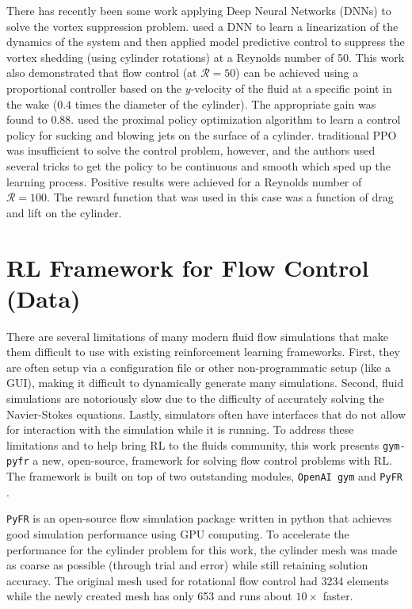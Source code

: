 \documentclass{article}
\begin{document}
There has recently been some work applying Deep Neural Networks (DNNs) to solve the vortex suppression problem. \cite{morton2018deep} used a DNN to learn a linearization of the dynamics of the system and then applied model predictive control to suppress the vortex shedding (using cylinder rotations) at a Reynolds number of 50. This work also demonstrated that flow control (at $\mathcal{R} = 50$) can be achieved using a proportional controller based on the $y$-velocity of the fluid at a specific point in the wake ($0.4$ times the diameter of the cylinder). The appropriate gain was found to $0.88$.  \cite{rabault2018deep, rabault2019artificial} used the proximal policy optimization algorithm to learn a control policy for sucking and blowing jets on the surface of a cylinder. traditional PPO was insufficient to solve the control problem, however, and the authors used several tricks to get the policy to be continuous and smooth which sped up the learning process. Positive results were achieved for a Reynolds number of $\mathcal{R} = 100$. The reward function that was used in this case was a function of drag and lift on the cylinder.

\section{RL Framework for Flow Control (Data)}
\label{sec:data}

There are several limitations of many modern fluid flow simulations that make them difficult to use with existing reinforcement learning frameworks. First, they are often setup via a configuration file or other non-programmatic setup (like a GUI), making it difficult to dynamically generate many simulations. Second, fluid simulations are notoriously slow due to the difficulty of accurately solving the Navier-Stokes equations. Lastly, simulators often have interfaces that do not allow for interaction with the simulation while it is running.  To address these limitations and to help bring RL to the fluids community, this work presents \verb|gym-pyfr| a new, open-source, framework for solving flow control problems with RL. The framework is built on top of two outstanding modules, \verb|OpenAI gym| \cite{brockman2016openai} and \verb|PyFR| \cite{witherden2014pyfr}. 

\verb|PyFR| is an open-source flow simulation package written in python that achieves good simulation performance using GPU computing. To accelerate the performance for the cylinder problem for this work, the cylinder mesh was made as coarse as possible (through trial and error) while still retaining solution accuracy. The original mesh used for rotational flow control had 3234 elements while the newly created mesh has only 653 and runs about $10\times$ faster.
\end{document}
